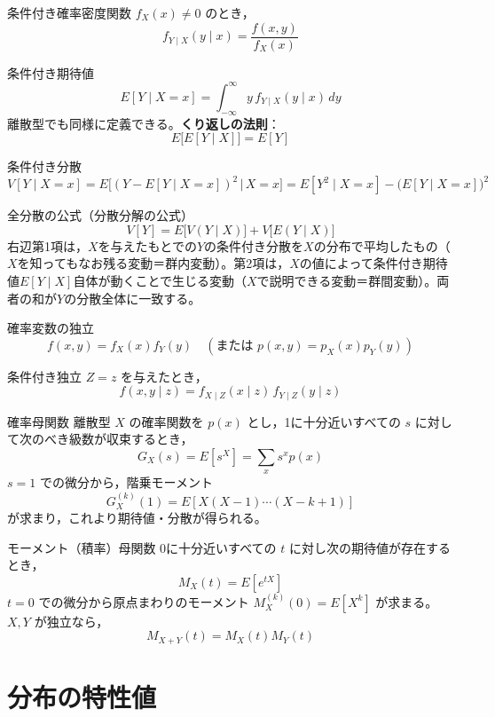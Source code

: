 \documentclass[a4paper,11pt]{ltjsarticle}
\begin{document}
\begin{term}{条件付き確率密度関数}
$f_X(x)\ne 0$ のとき，
\[
f_{Y\mid X}(y\mid x) = \frac{f(x,y)}{f_X(x)}
\]
\end{term}

\begin{term}{条件付き期待値}
\[
E[Y\mid X=x] = \int_{-\infty}^{\infty} y\,f_{Y\mid X}(y\mid x)\,dy
\]
離散型でも同様に定義できる。\textbf{くり返しの法則}：
\[
E\big[E[Y\mid X]\big] = E[Y]
\]
\end{term}

\begin{term}{条件付き分散}
\[
V[Y\mid X=x] = E\big[(Y-E[Y\mid X=x])^2 \,\big|\, X=x\big] = E[Y^2\mid X=x] - \big(E[Y\mid X=x]\big)^2
\]
\end{term}

\begin{term}{全分散の公式（分散分解の公式）}
\[
V[Y] = E\big[V(Y\mid X)\big] + V\big[E(Y\mid X)\big]
\]
右辺第1項は，$X$を与えたもとでの$Y$の条件付き分散を$X$の分布で平均したもの（$X$を知ってもなお残る変動＝群内変動）。第2項は，$X$の値によって条件付き期待値$E[Y\mid X]$自体が動くことで生じる変動（$X$で説明できる変動＝群間変動）。両者の和が$Y$の分散全体に一致する。
\end{term}

\begin{term}{確率変数の独立}
\[
f(x,y) = f_X(x)f_Y(y) \quad(\text{または }p(x,y)=p_X(x)p_Y(y))
\]
\end{term}

\begin{term}{条件付き独立}
$Z=z$ を与えたとき，
\[
f(x,y\mid z) = f_{X\mid Z}(x\mid z)\,f_{Y\mid Z}(y\mid z)
\]
\end{term}

\begin{term}{確率母関数}
離散型 $X$ の確率関数を $p(x)$ とし，1に十分近いすべての $s$ に対して次のべき級数が収束するとき，
\[
G_X(s) = E[s^X] = \sum_x s^x p(x)
\]
$s=1$ での微分から，階乗モーメント
\[
G_X^{(k)}(1) = E[X(X-1)\cdots(X-k+1)]
\]
が求まり，これより期待値・分散が得られる。
\end{term}

\begin{term}{モーメント（積率）母関数}
0に十分近いすべての $t$ に対し次の期待値が存在するとき，
\[
M_X(t) = E[e^{tX}]
\]
$t=0$ での微分から原点まわりのモーメント $M_X^{(k)}(0)=E[X^k]$ が求まる。$X,Y$ が独立なら，
\[
M_{X+Y}(t) = M_X(t)M_Y(t)
\]
\end{term}

\section{分布の特性値}
\end{document}
